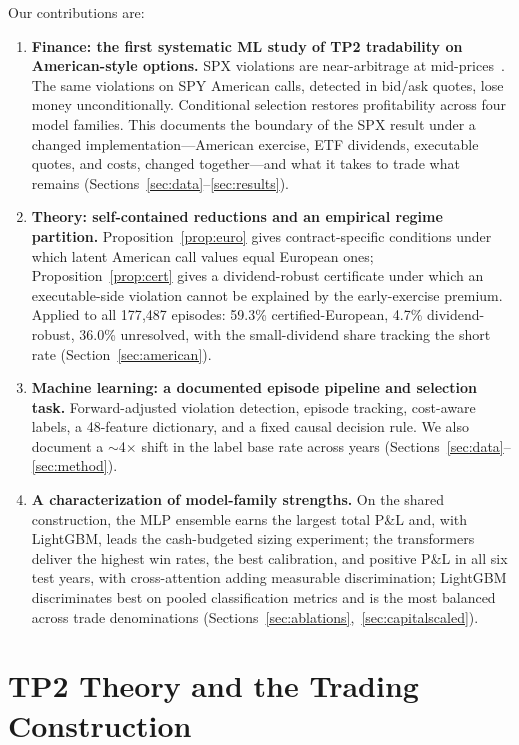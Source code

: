 \documentclass[sigconf,review]{acmart}
\begin{document}
Our contributions are:
\begin{enumerate}
\item \textbf{Finance: the first systematic ML study of TP2 tradability on American-style options.} SPX violations are near-arbitrage at mid-prices~\cite{glasserman2025tp2}. The same violations on SPY American calls, detected in bid/ask quotes, lose money unconditionally. Conditional selection restores profitability across four model families. This documents the boundary of the SPX result under a changed implementation---American exercise, ETF dividends, executable quotes, and costs, changed together---and what it takes to trade what remains (Sections~\ref{sec:data}--\ref{sec:results}).
\item \textbf{Theory: self-contained reductions and an empirical regime partition.} Proposition~\ref{prop:euro} gives contract-specific conditions under which latent American call values equal European ones; Proposition~\ref{prop:cert} gives a dividend-robust certificate under which an executable-side violation cannot be explained by the early-exercise premium. Applied to all 177{,}487 episodes: 59.3\% certified-European, 4.7\% dividend-robust, 36.0\% unresolved, with the small-dividend share tracking the short rate (Section~\ref{sec:american}).
\item \textbf{Machine learning: a documented episode pipeline and selection task.} Forward-adjusted violation detection, episode tracking, cost-aware labels, a 48-feature dictionary, and a fixed causal decision rule. We also document a $\sim$4$\times$ shift in the label base rate across years (Sections~\ref{sec:data}--\ref{sec:method}).
\item \textbf{A characterization of model-family strengths.} On the shared construction, the MLP ensemble earns the largest total P\&L and, with LightGBM, leads the cash-budgeted sizing experiment; the transformers deliver the highest win rates, the best calibration, and positive P\&L in all six test years, with cross-attention adding measurable discrimination; LightGBM discriminates best on pooled classification metrics and is the most balanced across trade denominations (Sections~\ref{sec:ablations},~\ref{sec:capitalscaled}).
\end{enumerate}

\section{TP2 Theory and the Trading Construction}
\label{sec:related}
\end{document}
